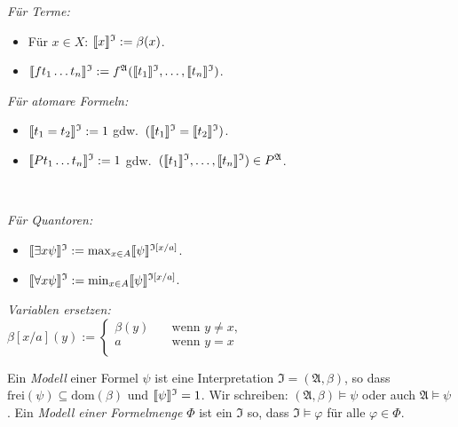 \documentclass{panikzettel}
\DeclarePairedDelimiter\interpret{\llbracket}{\rrbracket}
\newcommand{\J}{\mathfrak{I}}
\newcommand{\A}{\mathfrak{A}}
\newcommand{\dom}{\mathrm{dom}}
\newcommand{\frei}{\mathrm{frei}}
\begin{document}
\begin{minipage}[t]{0.45\textwidth}
\emph{Für Terme:}
\begin{itemize}
    \itemsep0em
    \item Für $x \in X$: $\interpret{x}^\J := \beta(x)$.
    \item $\interpret{f t_1 \ldots t_n}^\J := f^\A(\interpret{t_1}^\J, \ldots, \interpret{t_n}^\J)$.
\end{itemize}
\end{minipage}
\begin{minipage}[t]{0.55\textwidth}
\emph{Für atomare Formeln:}
\begin{itemize}
    \itemsep0em
    \item $\interpret{t_1 = t_2}^\J := 1 $ gdw.\ $(\interpret{t_1}^\J = \interpret{t_2}^\J)$.
    \item $\interpret{P t_1 \ldots t_n}^\J := 1$ gdw.\ $(\interpret{t_1}^\J, \ldots, \interpret{t_n}^\J) \in P^\A$.
\end{itemize}
\end{minipage}
\bigskip \\
\begin{minipage}[t]{0.45\textwidth}
\emph{Für Quantoren:}
\begin{itemize}
    \itemsep0em
    \item $\interpret{\exists x \psi}^\J := \max_{x \in A} \interpret{\psi}^{\J [x/a]}$.
    \item $\interpret{\forall x \psi}^\J := \min_{x \in A} \interpret{\psi}^{\J [x/a]}$.
\end{itemize}
\end{minipage}
\begin{minipage}[t]{0.55\textwidth}
\emph{Variablen ersetzen:}
\vspace{2ex} \\
$\beta[x/a](y) :=  \begin{cases}
       \beta(y) &\quad\text{wenn } y \neq x, \\
       a &\quad\text{wenn } y = x \\
     \end{cases}$
\end{minipage}
\medskip

Ein \emph{Modell} einer Formel $\psi$ ist eine Interpretation $\J = (\A, \beta)$, so dass $\frei(\psi) \subseteq \dom(\beta)$ und $\interpret{\psi}^\J = 1$. Wir schreiben: $(\A, \beta) \models \psi$ oder auch $\A \models \psi$. Ein \emph{Modell einer Formelmenge} $\Phi$ ist ein $\J$ so, dass $\J \models \varphi$ für alle $\varphi \in \Phi$.
\end{document}
